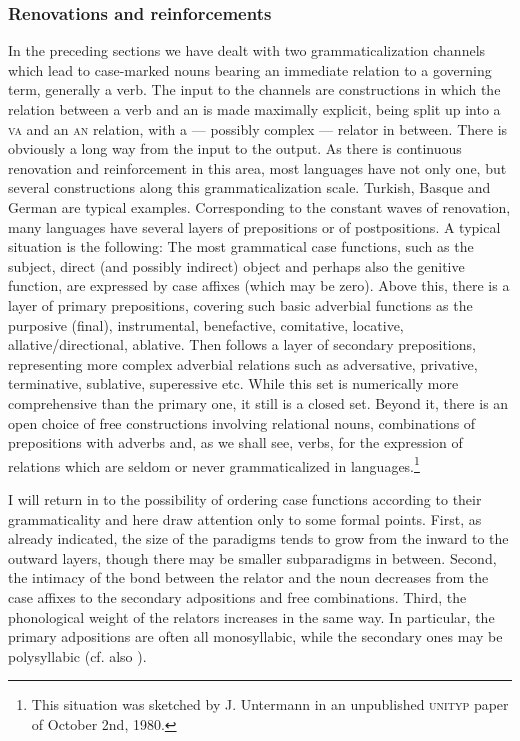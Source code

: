 \subsubsection{Renovations and reinforcements}
In the preceding sections we have dealt with two grammaticalization channels which lead to case-marked nouns bearing an immediate relation to a governing term, generally a verb. The input to the channels are constructions in which the relation between a verb and an \np is made maximally explicit, being split up into a \textsc{va} and an \textsc{an} relation, with a — possibly complex — relator in between. There is obviously a long way from the input to the output. As there is continuous renovation and reinforcement in this area, most languages have not only one, but several constructions along this grammaticalization scale. Turkish, Basque and German are typical examples. Corresponding to the constant waves of renovation, many languages have several layers of prepositions or of postpositions.\label{page102} A typical situation is the following: The most grammatical case functions, such as the subject, direct (and possibly indirect) object and perhaps also the genitive function, are expressed by case affixes (which may be zero). Above this, there is a layer of primary prepositions, covering such basic adverbial functions as the purposive (final), instrumental, benefactive, comitative, locative, allative/directional, ablative. Then follows a layer of secondary prepositions, representing more complex adverbial relations such as adversative, privative, terminative, sublative, superessive etc. While this set is numerically more comprehensive than the primary one, it still is a closed set. Beyond it, there is an open choice of free constructions involving relational nouns, combinations of prepositions with adverbs and, as we shall see, verbs, for the expression of relations which are seldom or never grammaticalized in languages.\footnote{This situation was sketched by J. Untermann in an unpublished \textsc{unityp} paper of October 2nd, 1980.}

I will return in  to the possibility of ordering case functions according to their grammaticality and here draw attention only to some formal points. First, as already indicated, the size of the paradigms tends to grow from the inward to the outward layers, though there may be smaller subparadigms in between. Second, the intimacy of the bond between the relator and the noun decreases from the case affixes to the secondary adpositions and free combinations. Third, the phonological weight of the relators increases in the same way. In particular, the primary adpositions are often all monosyllabic, while the secondary ones may be polysyllabic (cf. also \citealt[138]{Kahr1976}).

